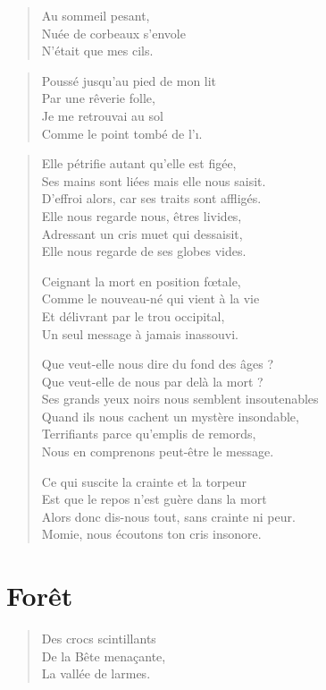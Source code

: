 \begin{verse}
Au sommeil pesant,\\
Nuée de corbeaux s’envole\\
N’était que mes cils.
\end{verse}

\begin{verse}
Poussé jusqu’au pied de mon lit\\
Par une rêverie folle,\\
Je me retrouvai au sol\\
Comme le point tombé de l’ı.
\end{verse}

\begin{verse}
Elle pétrifie autant qu’elle est figée,\\
Ses mains sont liées mais elle nous saisit.\\
D’effroi alors, car ses traits sont affligés.\\
Elle nous regarde nous, êtres livides,\\
Adressant un cris muet qui dessaisit,\\
Elle nous regarde de ses globes vides.

Ceignant la mort en position fœtale,\\
Comme le nouveau-né qui vient à la vie\\
Et délivrant par le trou occipital,\\
Un seul message à jamais inassouvi.

Que veut-elle nous dire du fond des âges ?\\
Que veut-elle  de nous par delà la mort ?\\
Ses grands yeux noirs nous semblent insoutenables\\
Quand ils nous cachent un mystère insondable,\\
Terrifiants parce qu’emplis de remords,\\
Nous en comprenons peut-être le message.

Ce qui suscite la crainte et la torpeur\\
Est que le repos n’est guère dans la mort\\
Alors donc dis-nous tout, sans crainte ni peur.\\
Momie, nous écoutons ton cris insonore.
\end{verse}

\section*{Forêt}
\begin{verse}
Des crocs scintillants\\
De la Bête menaçante,\\
La vallée de larmes.
\end{verse}

